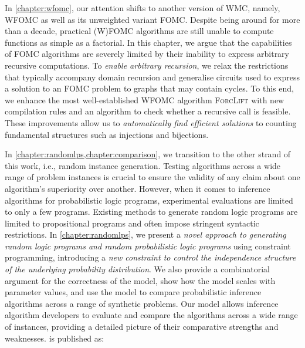 
In \cref{chapter:wfomc}, our attention shifts to another version of WMC, namely,
WFOMC as well as its unweighted variant FOMC\@. Despite being around for more
than a decade, practical (W)FOMC algorithms are still unable to compute
functions as simple as a factorial. In this chapter, we argue that the
capabilities of FOMC algorithms are severely limited by their inability to
express arbitrary recursive computations. To \emph{enable arbitrary recursion},
we relax the restrictions that typically accompany domain recursion and
generalise circuits used to express a solution to an FOMC problem to graphs that
may contain cycles. To this end, we enhance the most well-established WFOMC
algorithm \textsc{ForcLift} \citep{DBLP:conf/ijcai/BroeckTMDR11} with new
compilation rules and an algorithm to check whether a recursive call is
feasible. These improvements allow us to \emph{automatically find efficient
  solutions} to counting fundamental structures such as injections and
bijections.


In \cref{chapter:randomlps,chapter:comparison}, we transition to the other
strand of this work, i.e., random instance generation. Testing algorithms across
a wide range of problem instances is crucial to ensure the validity of any claim
about one algorithm's superiority over another. However, when it comes to
inference algorithms for probabilistic logic programs, experimental evaluations
are limited to only a few programs. Existing methods to generate random logic
programs are limited to propositional programs and often impose stringent
syntactic restrictions. In \cref{chapter:randomlps}, we present a \emph{novel
  approach to generating random logic programs and random probabilistic logic
  programs} using constraint programming, introducing a \emph{new constraint to
  control the independence structure of the underlying probability
  distribution}. We also provide a combinatorial argument for the correctness of
the model, show how the model scales with parameter values, and use the model to
compare probabilistic inference algorithms across a range of synthetic problems.
Our model allows inference algorithm developers to evaluate and compare the
algorithms across a wide range of instances, providing a detailed picture of
their comparative strengths and weaknesses.  is
published as:
\begin{displayquote}
\end{displayquote}

